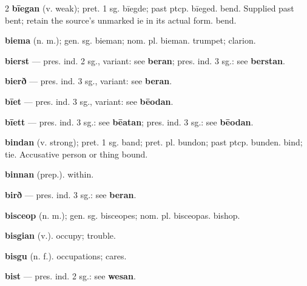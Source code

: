 \begin{multicols*}{2}
\textbf{bīegan} (v. weak); pret. 1 sg. bīegde; past ptcp. bīeged. bend. Supplied past bent; retain the source's unmarked ie in its actual form. bend.\par
\textbf{biema} (n. m.); gen. sg. bieman; nom. pl. bieman. trumpet; clarion.\par
\textbf{bierst} — pres. ind. 2 sg., variant: see \textbf{beran}; pres. ind. 3 sg.: see \textbf{berstan}.\par
\textbf{bierð} — pres. ind. 3 sg., variant: see \textbf{beran}.\par
\textbf{bīet} — pres. ind. 3 sg., variant: see \textbf{bēodan}.\par
\textbf{bīett} — pres. ind. 3 sg.: see \textbf{bēatan}; pres. ind. 3 sg.: see \textbf{bēodan}.\par
\textbf{bindan} (v. strong); pret. 1 sg. band; pret. pl. bundon; past ptcp. bunden. bind; tie. Accusative person or thing bound.\par
\textbf{binnan} (prep.). within.\par
\textbf{birð} — pres. ind. 3 sg.: see \textbf{beran}.\par
\textbf{bisceop} (n. m.); gen. sg. bisceopes; nom. pl. bisceopas. bishop.\par
\textbf{bisgian} (v.). occupy; trouble.\par
\textbf{bisgu} (n. f.). occupations; cares.\par
\textbf{bist} — pres. ind. 2 sg.: see \textbf{wesan}.\par

\end{multicols*}
